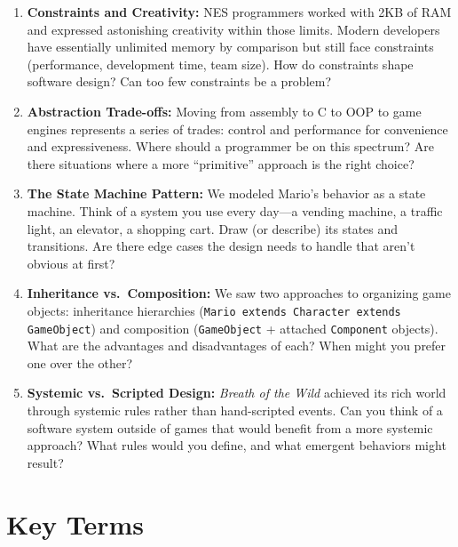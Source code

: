 \documentclass[11pt,letterpaper]{article}
\begin{document}
\begin{questionbox}
\begin{enumerate}[leftmargin=*, label=\textcolor{cswarm}{\textbf{\arabic*.}}]
    \item \textbf{Constraints and Creativity:} NES programmers worked with 2KB of RAM and expressed astonishing creativity within those limits. Modern developers have essentially unlimited memory by comparison but still face constraints (performance, development time, team size). How do constraints shape software design? Can too few constraints be a problem?

    \item \textbf{Abstraction Trade-offs:} Moving from assembly to C to OOP to game engines represents a series of trades: control and performance for convenience and expressiveness. Where should a programmer be on this spectrum? Are there situations where a more ``primitive'' approach is the right choice?

    \item \textbf{The State Machine Pattern:} We modeled Mario's behavior as a state machine. Think of a system you use every day---a vending machine, a traffic light, an elevator, a shopping cart. Draw (or describe) its states and transitions. Are there edge cases the design needs to handle that aren't obvious at first?

    \item \textbf{Inheritance vs.\ Composition:} We saw two approaches to organizing game objects: inheritance hierarchies (\texttt{Mario extends Character extends GameObject}) and composition (\texttt{GameObject} + attached \texttt{Component} objects). What are the advantages and disadvantages of each? When might you prefer one over the other?

    \item \textbf{Systemic vs.\ Scripted Design:} \textit{Breath of the Wild} achieved its rich world through systemic rules rather than hand-scripted events. Can you think of a software system outside of games that would benefit from a more systemic approach? What rules would you define, and what emergent behaviors might result?
\end{enumerate}
\end{questionbox}

\section*{Key Terms}
\end{document}
